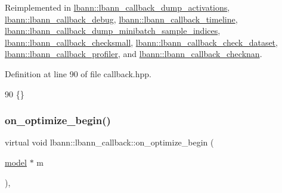 Reimplemented in \hyperlink{classlbann_1_1lbann__callback__dump__activations_acf4429a44ead6ffea303528618bc6572}{lbann\+::lbann\+\_\+callback\+\_\+dump\+\_\+activations}, \hyperlink{classlbann_1_1lbann__callback__debug_acb3d05be6c600f4d61957ccf10606ddc}{lbann\+::lbann\+\_\+callback\+\_\+debug}, \hyperlink{classlbann_1_1lbann__callback__timeline_a28f4387fda222bf988d744e0b2ec8b4b}{lbann\+::lbann\+\_\+callback\+\_\+timeline}, \hyperlink{classlbann_1_1lbann__callback__dump__minibatch__sample__indices_ac1a1359c0016eb0bcbdb767fc57e9154}{lbann\+::lbann\+\_\+callback\+\_\+dump\+\_\+minibatch\+\_\+sample\+\_\+indices}, \hyperlink{classlbann_1_1lbann__callback__checksmall_a2f50695feb1444145bae251f2e94b721}{lbann\+::lbann\+\_\+callback\+\_\+checksmall}, \hyperlink{classlbann_1_1lbann__callback__check__dataset_acedc222fc108c156d089f1baa8c040af}{lbann\+::lbann\+\_\+callback\+\_\+check\+\_\+dataset}, \hyperlink{classlbann_1_1lbann__callback__profiler_a6cfc4cf84fe4229f627d18ad19eaa415}{lbann\+::lbann\+\_\+callback\+\_\+profiler}, and \hyperlink{classlbann_1_1lbann__callback__checknan_a09388ae76566a6a93c957ab76cd54dcd}{lbann\+::lbann\+\_\+callback\+\_\+checknan}.



Definition at line 90 of file callback.\+hpp.


\begin{DoxyCode}
90 \{\}
\end{DoxyCode}
\mbox{\label{classlbann_1_1lbann__callback_a1a9248b305f06419889c1b3b0f0893d8}} 
\subsubsection{\texorpdfstring{on\+\_\+optimize\+\_\+begin()}{on\_optimize\_begin()}\hspace{0.1cm}{\footnotesize\ttfamily [1/2]}}
{\footnotesize\ttfamily virtual void lbann\+::lbann\+\_\+callback\+::on\+\_\+optimize\+\_\+begin (\begin{DoxyParamCaption}\item[{\hyperlink{classlbann_1_1model}{model} $\ast$}]{m }\end{DoxyParamCaption})\hspace{0.3cm}{\ttfamily [inline]}, {\ttfamily [virtual]}}

